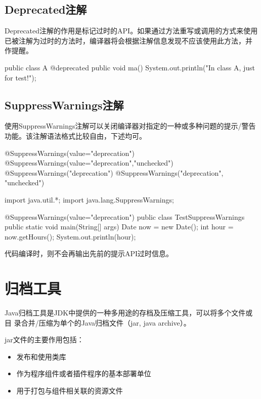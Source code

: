 \subsection{Deprecated注解}

Deprecated注解的作用是标记过时的API。如果通过方法重写或调用的方式来使用
已被注解为过时的方法时，编译器将会根据注解信息发现不应该使用此方法，并
作提醒。

\begin{javaCode}
  public class A { 
    @deprecated
    public void ma() {
      System.out.println("In class A, just for test!");
    } 
  }
\end{javaCode}

\subsection{SuppressWarnings注解}

使用SuppressWarnings注解可以关闭编译器对指定的一种或多种问题的提示/警告
功能。该注解语法格式比较自由，下述均可。

\begin{javaCode}
  @SuppressWarnings(value={"deprecation"})
  @SuppressWarnings(value={"deprecation","unchecked"}) 
  @SuppressWarnings("deprecation") 
  @SuppressWarnings({"deprecation", "unchecked"})
\end{javaCode}

\begin{javaCode}
  import java.util.*;
  import java.lang.SuppressWarnings; 

  @SuppressWarnings(value={"deprecation"}) 
  public class TestSuppressWarnings {
    public static void main(String[] args) {
      Date now = new Date();
      int hour = now.getHours(); 
      System.out.println(hour);
    } 
  }  
\end{javaCode}

代码编译时，则不会再输出先前的提示API过时信息。

\section{归档工具}

Java归档工具是JDK中提供的一种多用途的存档及压缩工具，可以将多个文件或目
录合并/压缩为单个的Java归档文件（jar, java archive）。

jar文件的主要作用包括：

\begin{itemize}\kai
\item 发布和使用类库
\item 作为程序组件或者插件程序的基本部署单位
\item 用于打包与组件相关联的资源文件
\end{itemize}

